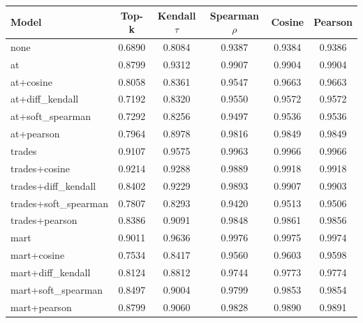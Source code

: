 \begin{tabular}{lccccc}
\toprule
Model & Top-k & Kendall $\tau$ & Spearman $\rho$ & Cosine & Pearson \\
\midrule
none & 0.6890 & 0.8084 & 0.9387 & 0.9384 & 0.9386 \\
at & 0.8799 & 0.9312 & 0.9907 & 0.9904 & 0.9904 \\
at+cosine & 0.8058 & 0.8361 & 0.9547 & 0.9663 & 0.9663 \\
at+diff_kendall & 0.7192 & 0.8320 & 0.9550 & 0.9572 & 0.9572 \\
at+soft_spearman & 0.7292 & 0.8256 & 0.9497 & 0.9536 & 0.9536 \\
at+pearson & 0.7964 & 0.8978 & 0.9816 & 0.9849 & 0.9849 \\
trades & 0.9107 & 0.9575 & 0.9963 & 0.9966 & 0.9966 \\
trades+cosine & 0.9214 & 0.9288 & 0.9889 & 0.9918 & 0.9918 \\
trades+diff_kendall & 0.8402 & 0.9229 & 0.9893 & 0.9907 & 0.9903 \\
trades+soft_spearman & 0.7807 & 0.8293 & 0.9420 & 0.9513 & 0.9506 \\
trades+pearson & 0.8386 & 0.9091 & 0.9848 & 0.9861 & 0.9856 \\
mart & 0.9011 & 0.9636 & 0.9976 & 0.9975 & 0.9974 \\
mart+cosine & 0.7534 & 0.8417 & 0.9560 & 0.9603 & 0.9598 \\
mart+diff_kendall & 0.8124 & 0.8812 & 0.9744 & 0.9773 & 0.9774 \\
mart+soft_spearman & 0.8497 & 0.9004 & 0.9799 & 0.9853 & 0.9854 \\
mart+pearson & 0.8799 & 0.9060 & 0.9828 & 0.9890 & 0.9891 \\
\bottomrule
\end{tabular}
